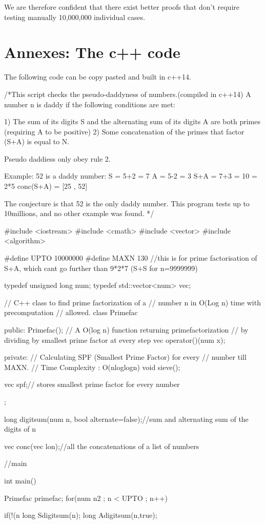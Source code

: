 \documentclass[a4paper, 11pt]{report}
\begin{document}
	We are therefore confident that there exist better proofs that don't require testing manually 10,000,000 individual cases.

\newpage
\section{Annexes: The c++ code}
	The following code can be copy pasted and built in c++14.
\begin{c++}

/*This script checks the pseudo-daddyness of numbers.(compiled in c++14)
A number n is daddy if the following conditions are met:

1) The sum of its digits S and the alternating sum of its digits A are both primes (requiring A to be positive)
2) Some concatenation of the primes that factor (S+A) is equal to N.

Pseudo daddiess only obey rule 2.

Example: 52 is a daddy number:
S = 5+2 = 7
A = 5-2 = 3
S+A = 7+3 = 10 = 2*5
conc(S+A) = [25 , 52]

The conjecture is that 52 is the only daddy number. This program tests up to 10millions, and no other example was found.
*/

#include <iostream>
#include <cmath>
#include <vector>
#include <algorithm>

#define UPTO 10000000
#define MAXN 130 //this is for prime factorisation of S+A, which cant go further than 9*2*7 (S+S for n=9999999)

typedef unsigned long num;
typedef std::vector<num> vec;

// C++ class to find prime factorization of a 
// number n in O(Log n) time with precomputation 
// allowed. 
class Primefac
{
public:
	Primefac();
	// A O(log n) function returning primefactorization 
	// by dividing by smallest prime factor at every step 
	vec operator()(num x);

private:
	// Calculating SPF (Smallest Prime Factor) for every 
	// number till MAXN. 
	// Time Complexity : O(nloglogn) 
	void sieve();

	vec spf;// stores smallest prime factor for every number 
};

long digitsum(num n, bool alternate=false);//sum and alternating sum of the digits of n

vec conc(vec lon);//all the concatenations of a list of numbers

//main

int main()
{
	Primefac primefac{};
	for(num n{2} ; n < UPTO ; n++)
	{
		if(!(n%
		long S{digitsum(n)};
		long A{digitsum(n,true)};

}}
\end{c++}
\end{document}
